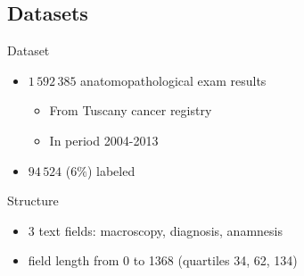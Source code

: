 \subsection{Datasets}
\begin{frame}{Dataset}
    \begin{center}
    \scriptsize
    \def\angle{0}
    \def\radius{3}
    \def\cyclelist{{"orange","blue","red","green"}}
    \newcount\cyclecount {}
    \newcount\ind {}
  \end{center}
  \begin{itemize}
  \item \alert{$1\,592\,385$} anatomopathological exam results
    \begin{itemize}
    \item From \alert{Tuscany} cancer registry
    \item In period \alert{2004-2013}
    \end{itemize}
  \item \alert{$94\,524$} ($6\%$) labeled
  \end{itemize}
  \begin{block}{Structure}
    \begin{itemize}
    \item 3 text \alert{fields}: macroscopy, diagnosis, anamnesis
    \item field \alert{length} from 0 to 1368 (quartiles 34, 62, 134)
    \end{itemize}
  \end{block}
\end{frame}

